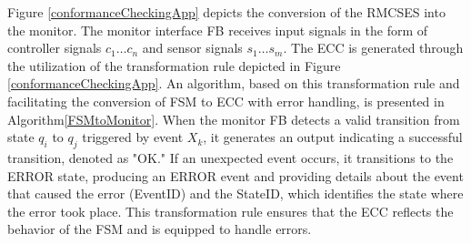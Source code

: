 \documentclass{ieeeojies}
\begin{document}
Figure \ref{conformanceCheckingApp} depicts the conversion of the RMCSES into the monitor. The monitor interface FB receives input signals in the form of controller signals $c_1 \dots c_n$ and sensor signals $s_1 \dots s_m$. The ECC is generated through the utilization of the transformation rule depicted in Figure \ref{conformanceCheckingApp}. An algorithm, based on this transformation rule and facilitating the conversion of FSM to ECC with error handling, is presented in Algorithm\ref{FSMtoMonitor}. When the monitor FB detects a valid transition from state $q_i$ to $q_j$ triggered by event $X_k$, it generates an output indicating a successful transition, denoted as "OK." If an unexpected event occurs, it transitions to the ERROR state, producing an ERROR event and providing details about the event that caused the error (EventID) and the StateID, which identifies the state where the error took place. This transformation rule ensures that the ECC reflects the behavior of the FSM  and is equipped to handle errors.
\end{document}

